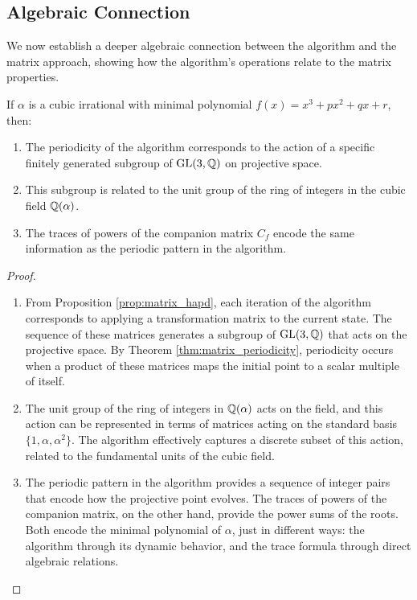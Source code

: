\subsection{Algebraic Connection}

We now establish a deeper algebraic connection between the \HAPD{} algorithm and the matrix approach, showing how the algorithm's operations relate to the matrix properties.

\begin{theorem}\label{thm:algebraic_connection}
If $\alpha$ is a cubic irrational with minimal polynomial $f(x) = x^3 + px^2 + qx + r$, then:
\begin{enumerate}
    \item The periodicity of the \HAPD{} algorithm corresponds to the action of a specific finitely generated subgroup of $\operatorname{GL}(3, \mathbb{Q})$ on projective space.
    \item This subgroup is related to the unit group of the ring of integers in the cubic field $\mathbb{Q}(\alpha)$.
    \item The traces of powers of the companion matrix $C_f$ encode the same information as the periodic pattern in the \HAPD{} algorithm.
\end{enumerate}
\end{theorem}

\begin{proof}
\begin{enumerate}
    \item From Proposition \ref{prop:matrix_hapd}, each iteration of the \HAPD{} algorithm corresponds to applying a transformation matrix to the current state. The sequence of these matrices generates a subgroup of $\operatorname{GL}(3, \mathbb{Q})$ that acts on the projective space. By Theorem \ref{thm:matrix_periodicity}, periodicity occurs when a product of these matrices maps the initial point to a scalar multiple of itself.
    
    \item The unit group of the ring of integers in $\mathbb{Q}(\alpha)$ acts on the field, and this action can be represented in terms of matrices acting on the standard basis $\{1, \alpha, \alpha^2\}$. The \HAPD{} algorithm effectively captures a discrete subset of this action, related to the fundamental units of the cubic field.
    
    \item The periodic pattern in the \HAPD{} algorithm provides a sequence of integer pairs that encode how the projective point evolves. The traces of powers of the companion matrix, on the other hand, provide the power sums of the roots. Both encode the minimal polynomial of $\alpha$, just in different ways: the \HAPD{} algorithm through its dynamic behavior, and the trace formula through direct algebraic relations.
\end{enumerate}
\end{proof}

